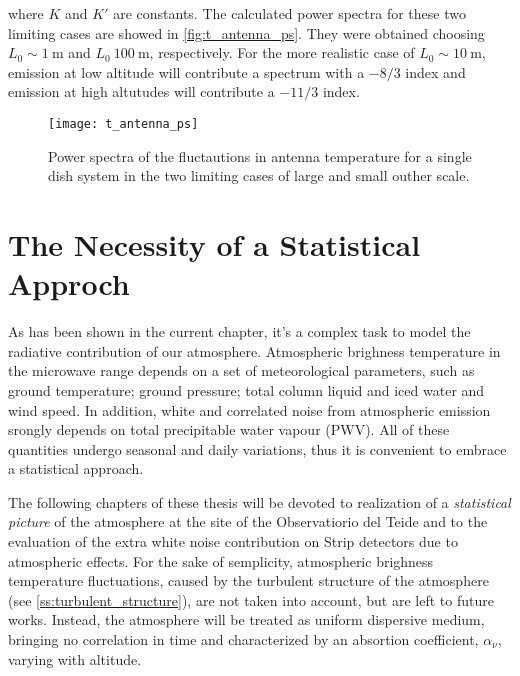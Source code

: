 where $K$ and $K'$ are constants. The calculated power spectra for these
two limiting cases are showed in \autoref{fig:t_antenna_ps}. They were
obtained choosing $L_0 \sim \SI{1}{\meter}$ and $L_0 ~ \SI{100}{\meter}$,
respectively. For the more realistic case of $L_0 \sim \SI{10}{\meter}$,
emission at low altitude will contribute a spectrum with a $-8/3$ index and
emission at high altutudes will contribute a $-11/3$ index.

\begin{figure}
        \centering
        \texttt{[image: t\_antenna\_ps]}
        \caption{Power spectra of the fluctautions in antenna temperature
        for a single dish system in the two limiting cases of large and
        small outher scale.}
        \label{fig:t_antenna_ps}
\end{figure}

\section{The Necessity of a Statistical Approch}

As has been shown in the current chapter, it's a complex task to model
the radiative contribution of our atmosphere. Atmospheric brighness
temperature in the microwave range depends on a set of
meteorological parameters, such as ground temperature; ground pressure;
total column liquid and iced water and wind speed. In addition,
white and correlated noise from atmospheric emission
srongly depends on total precipitable water vapour (PWV).
All of these quantities undergo seasonal and daily variations, thus
it is convenient to embrace a statistical approach.

The following chapters of these thesis will be devoted to realization of a
\emph{statistical picture} of the atmosphere at the site of the
Observatiorio del Teide and to the evaluation of the extra white noise
contribution on Strip detectors due to atmospheric effects. For the sake of
semplicity, atmospheric brighness temperature fluctuations, caused by
the turbulent structure of the atmosphere (see
\autoref{ss:turbulent_structure}), are not taken into account, but
are left to future works. Instead, the atmosphere will be treated as
uniform dispersive medium, bringing no correlation in time and
characterized by an absortion coefficient, $\alpha_\nu$, varying with
altitude.
